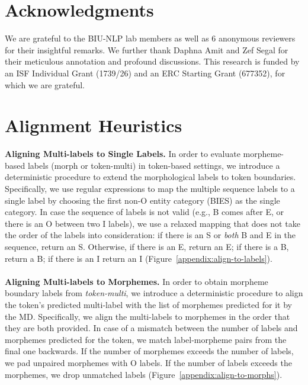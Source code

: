 \documentclass[11pt,a4paper]{article}
\begin{document}
\section*{Acknowledgments}
We are grateful to the BIU-NLP lab members as well as 6 anonymous reviewers for their insightful remarks. We further thank Daphna Amit and Zef Segal for their meticulous annotation and profound discussions. This research is funded by an ISF Individual Grant (1739/26) and an ERC Starting Grant (677352), for which we are grateful.


 




\appendix


\section{Alignment Heuristics}
\label{sec:appendix-extending-morph}


{\bf Aligning Multi-labels to Single Labels.}
In order to evaluate morpheme-based labels (morph or token-multi) in token-based settings, we introduce a deterministic procedure to extend the morphological labels to token boundaries.
Specifically, we use regular expressions to map the multiple sequence labels  to a single label by choosing the first non-O entity category (BIES) as the single category. In case the sequence of labels is not valid (e.g., B comes after E, or there is an O between two I labels), we use a relaxed mapping that does not take the order of the labels into consideration: if there is an S or {\em both} B and E in the sequence, return an S. Otherwise, if there is an E, return an E; if there is a B, return a B; if there is an I return an I (Figure~\ref{appendix:align-to-labels}).
\\\\

\noindent
{\bf Aligning Multi-labels to Morphemes.}
In order to obtain morpheme boundary labels from \emph{token-multi}, we introduce a deterministic procedure to align the token's predicted multi-label with the list of  morphemes predicted for it by the MD. 
Specifically, we  align the multi-labels to  morphemes in the order that they are both provided. In  case of a mismatch between  the number of labels and morphemes predicted for the token, we match  label-morpheme pairs from the final one  backwards.  If the number of morphemes exceeds the number of labels, we pad unpaired morphemes with O labels. If the 
number of labels exceeds the   morphemes, we drop  unmatched labels (Figure~\ref{appendix:align-to-morphs}).
\end{document}
